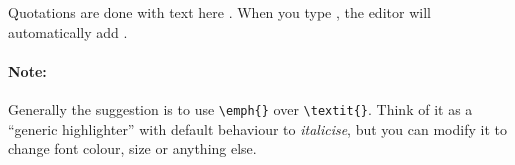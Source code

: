 Quotations are done with \textasciigrave\textasciigrave text here \textquotesingle\textquotesingle.
When you type \textasciigrave, the editor will automatically add \textquotesingle.

\paragraph{Note:} Generally the suggestion is to use \verb|\emph{}| over \verb|\textit{}|.
Think of it as a ``generic highlighter'' with default behaviour to \emph{italicise}, but you can modify it to change font colour, size or anything else.